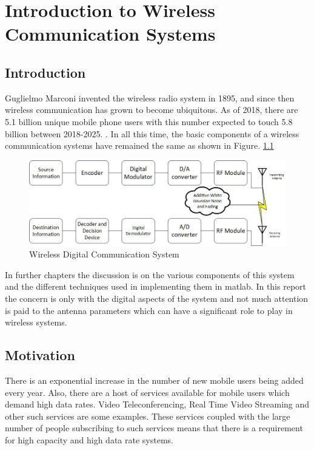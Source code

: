 \chapter{Introduction to Wireless Communication Systems} 
\section[Introduction]{\textbf{Introduction}}
Guglielmo Marconi invented the wireless radio system in 1895, and since then wireless communication has grown to become ubiquitous. As of 2018, there are 5.1 billion unique mobile phone users with this number expected to touch 5.8 billion between 2018-2025. \parencite{George2017}.
In all this time, the basic components of a wireless communication systems have remained the same as shown in Figure. 
\ref{fig:wireless block diagram}
\begin{figure}[htb]
\centering
\includegraphics[scale=0.8]{Chapter 1/Figures/Wireless Communication System Block Diagram}
\caption{Wireless Digital Communication System}
\label{fig:wireless block diagram}
\end{figure}
 
In further chapters the discussion is on the various components of this system and the different techniques used in implementing them in \gls{matlab}. In this report the concern is only with the digital aspects of the system and not much attention is paid to the antenna parameters which can have a significant role to play in wireless systems. 


\section[Motivation]{\textbf{Motivation}}
There is an exponential increase in the number of new mobile users being added every year. Also, there are a host of services available for mobile users which demand high data rates. Video Teleconferencing, Real Time Video Streaming and other such services are some examples. These services coupled with the large number of people subscribing to such services means that there is a requirement for high capacity and high data rate systems.\\

